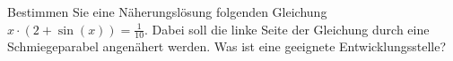 \item Bestimmen Sie eine Näherungslösung folgenden Gleichung $x\cdot(2+\sin(x))=\frac{1}{10}$. Dabei soll die linke Seite der Gleichung durch eine Schmiegeparabel angenähert werden. Was ist eine geeignete Entwicklungsstelle?